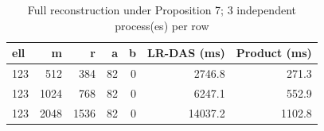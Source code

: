\begin{table}[t]
\centering
\small
\caption{Full reconstruction under Proposition 7; 3 independent process(es) per row}
\label{tab:runtime-3}
\begin{tabular}{@{}lrrrrrr@{}}
\toprule
ell & m & r & a & b & LR-DAS (ms) & Product (ms) \\
\midrule
123 & 512 & 384 & 82 & 0 & 2746.8 & 271.3 \\
123 & 1024 & 768 & 82 & 0 & 6247.1 & 552.9 \\
123 & 2048 & 1536 & 82 & 0 & 14037.2 & 1102.8 \\
\bottomrule
\end{tabular}
\end{table}
